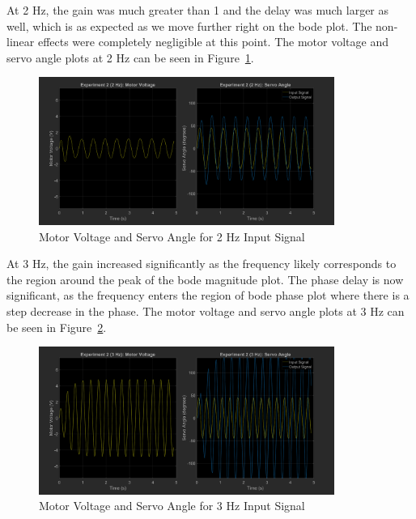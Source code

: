 \documentclass[12pt]{article}
\begin{document}
At 2 Hz, the gain was much greater than 1 and the delay was much larger as well, which is as expected as we move further right on the bode plot. The non-linear effects were completely negligible at this point. The motor voltage and servo angle plots at 2 Hz can be seen in Figure~\ref{fig:exp2_2}.
\begin{figure}[h!]
    \centering
    \includegraphics[width=0.86\textwidth]{exp2_2}
    \caption{\label{fig:exp2_2}Motor Voltage and Servo Angle for 2 Hz Input Signal}
\end{figure}

At 3 Hz, the gain increased significantly as the frequency likely corresponds to the region around the peak of the bode magnitude plot. The phase delay is now significant, as the frequency enters the region of bode phase plot where there is a step decrease in the phase. The motor voltage and servo angle plots at 3 Hz can be seen in Figure~\ref{fig:exp2_3}.
\begin{figure}[h!]
    \centering
    \includegraphics[width=0.86\textwidth]{exp2_3}
    \caption{\label{fig:exp2_3}Motor Voltage and Servo Angle for 3 Hz Input Signal}
\end{figure}
\end{document}
